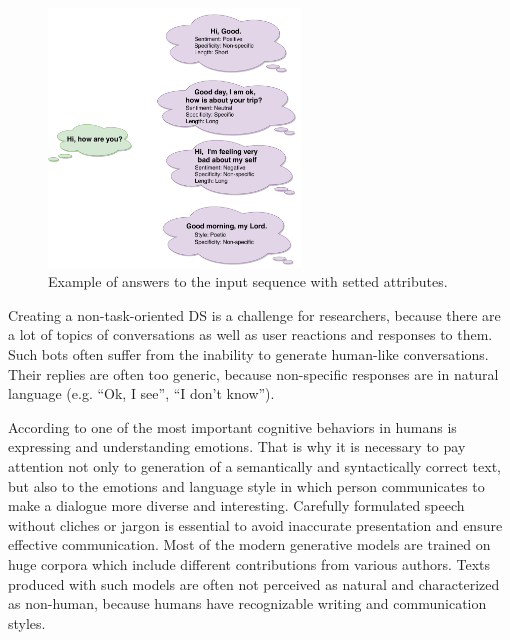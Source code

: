 \begin{figure}
  \centering
  \includegraphics[width=0.6\textwidth]{figures/dialogue_example.pdf}
  \caption{Example of answers to the input sequence with setted attributes.}
  \label{dialogue_example}
\end{figure}

Creating a non-task-oriented DS is a challenge for researchers, because there are a lot of topics of conversations as well as user reactions and responses to them. Such bots often suffer from the inability to generate human-like conversations. Their replies are often too generic, because non-specific responses are in natural language (e.g. ``Ok, I see'', ``I don't know''). 

According to \cite{salovey1990emotional} one of the most important cognitive behaviors in humans is expressing and understanding emotions. That is why it is necessary to pay attention not only to generation of a semantically and syntactically correct text, but also to the emotions and language style in which person communicates to make a dialogue more diverse and interesting. Carefully formulated speech without cliches or jargon is essential to avoid inaccurate presentation and ensure effective communication. Most of the modern generative models are trained on huge corpora which include different contributions from various authors. Texts produced with such models are often not perceived as natural and characterized as non-human, because humans have recognizable writing and communication styles.

